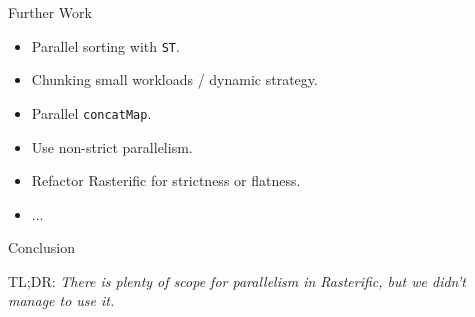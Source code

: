 \documentclass[slidestop,compress,mathserif, xcolor=table]{beamer}
\newcommand{\emp}[1]{\textit{\textcolor{scigreen}{#1}}}
\begin{document}
\begin{frame}[c]{Further Work}

\begin{itemize}
\item Parallel sorting with \texttt{ST}.
\item Chunking small workloads / dynamic strategy.
\item Parallel \texttt{concatMap}.
\item Use non-strict parallelism.
\item Refactor Rasterific for strictness or flatness.
\item ...
\end{itemize}
\end{frame}

\begin{frame}[c]{Conclusion}

TL;DR: \emp{There is plenty of scope for parallelism in Rasterific, but we didn't manage to use it.}

\end{frame}
\end{document}
